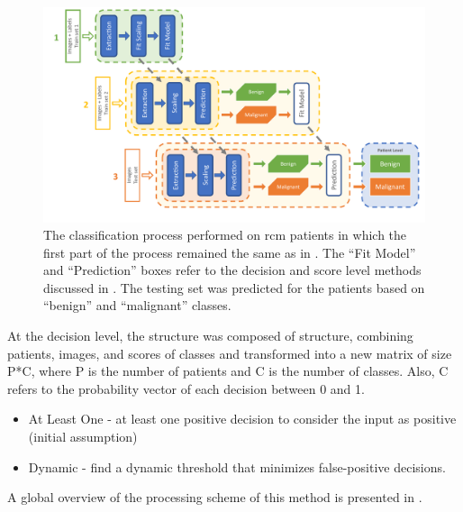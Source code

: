 \documentclass[journal,article,accept,moreauthors,pdftex, applsci]{Definitions/mdpi}
\begin{document}
\begin{figure}[H]
    \begin{center}
        \includegraphics[width=0.8\linewidth]{Figures/Process_Decision.pdf}
        \caption{The classification process performed on \ac{rcm} patients in which the first part of the process remained the same as in . The “Fit Model” and “Prediction” boxes refer to the decision and score level methods discussed in . The testing set was predicted for the patients based on “benign” and “malignant” classes.}
        \label{fig:decision_process}
    \end{center} 
\end{figure}\par
At the decision level, the structure was composed of structure, combining patients, images, and scores of classes and transformed into a new matrix of size P*C, where P is the number of patients and C is the number of classes. Also, C refers to the probability vector of each decision between 0 and 1.
\begin{itemize}
\item At Least One - at least one positive decision to consider the input as positive (initial assumption)
\item Dynamic - find a dynamic threshold that minimizes false-positive decisions.
\end{itemize}
A global overview of the processing scheme of this method is presented in .
\end{document}
